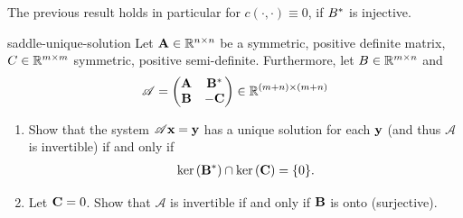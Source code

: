 \begin{remark}
  The previous result holds in particular for
  $c(\cdot,\cdot) \equiv 0$, if $B^*$ is injective.
\end{remark}

\begin{Problem}{saddle-unique-solution}
  Let $\mathbf A \in \mathbb R^{n\times n}$ be a symmetric, positive definite
  matrix, $C\in \mathbb R^{m\times m}$ symmetric, positive
  semi-definite. Furthermore, let $B \in \mathbb R^{m\times n}$ and
  \begin{gather}
    \mathscr A= 
    \begin{pmatrix}
      \mathbf A & \mathbf B^* \\ \mathbf B & -\mathbf C
    \end{pmatrix}
    \in \mathbb R^{(m+n)\times (m+n)}
  \end{gather}
  \begin{enumerate}
  \item Show that the system $\mathscr A \mathbf x = \mathbf y$ has a unique
    solution for each $\mathbf y$ (and thus $\mathscr A$ is invertible) if
    and only if
    \begin{gather}
      \operatorname{ker}\left(\mathbf B^*\right) \cap \operatorname{ker}\left(\mathbf C\right) = \{0\}.
    \end{gather}
  \item Let $\mathbf C = 0$. Show that $\mathscr A$ is invertible if and
    only if $\mathbf B$ is onto (surjective).
  \end{enumerate}
\end{Problem}

